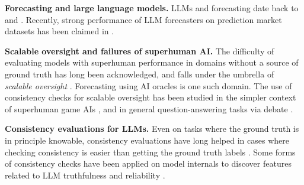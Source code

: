 \textbf{Forecasting and large language models.}
LLMs and forecasting date back to \citet{zou2022forecasting} and \citet{yan2023autocast++}. Recently, strong performance of LLM forecasters on prediction market datasets has been claimed in .

\textbf{Scalable oversight and failures of superhuman AI.}
The difficulty of evaluating models with superhuman performance in domains without a source of ground truth has long been acknowledged, and falls under the umbrella of \emph{scalable oversight}  \citep{amodei2016concrete}.
Forecasting using AI oracles is one such domain.  The use of consistency checks for scalable oversight has been studied in the simpler context of superhuman game AIs \citep{alphazero_not_robust, esmwcc},
and in general question-answering tasks via debate \citep{irving2018debate}.

\textbf{Consistency evaluations for LLMs.}
Even on tasks where the ground truth is in principle knowable,
consistency evaluations have long helped in cases where checking consistency is easier than getting the ground truth labels \citep{elazarPararel2021, liGeneratorValidatorConsistency2023}.
Some forms of consistency checks have been applied on model internals to discover features related to LLM truthfulness and reliability \citep{burnsDiscoveringLatentKnowledge2022a, kaarelSearchingModelConcepts2023}.

